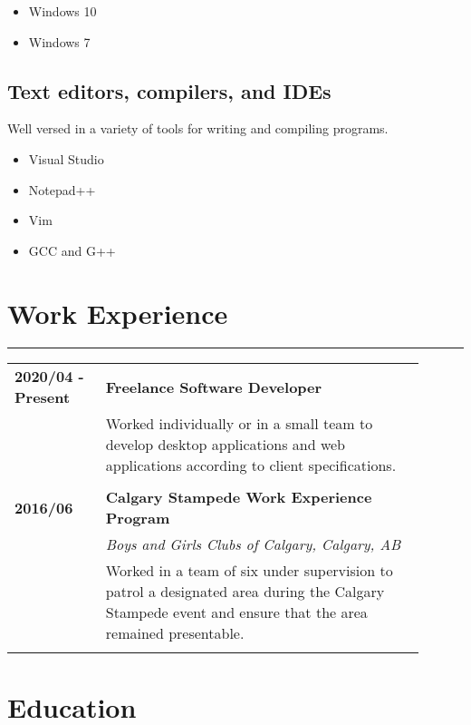 \documentclass[letterpaper]{article}
\newcommand{\horizontalLine}{%
    \rule{\linewidth}{0.4pt}
    \vspace{1ex}
}
\begin{document}
        \begin{itemize}[itemsep = 0pt]
            \item Windows 10
            \item Windows 7
        \end{itemize}

        \subsection*{Text editors, compilers, and IDEs}
        Well versed in a variety of tools for writing and compiling programs.

        \begin{itemize}[itemsep = 0pt]
            \item Visual Studio
            \item Notepad++
            \item Vim
            \item GCC and G++
        \end{itemize}

    \section*{Work Experience}

        \horizontalLine

        \begin{tabular}{p{0.2\linewidth} p{0.7\linewidth}} 
            \textbf{2020/04 - Present} & \large\textbf{Freelance Software Developer} \\
            & Worked individually or in a small team to develop desktop applications and web applications according to client specifications. \\
            \\
            \textbf{2016/06} & \large\textbf{Calgary Stampede Work Experience Program} \\
            & \emph{Boys and Girls Clubs of Calgary, Calgary, AB} \\
            & Worked in a team of six under supervision to patrol a designated area during the Calgary Stampede event and ensure that the area remained presentable. \\
            \\
        \end{tabular}

    \section*{Education}
\end{document}
